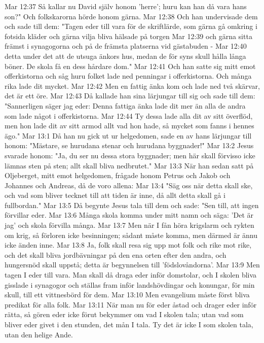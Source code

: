 Mar 12:37  Så kallar nu David själv honom 'herre'; huru kan han då vara hans son?" Och folkskarorna hörde honom gärna.
Mar 12:38  Och han undervisade dem och sade till dem: "Tagen eder till vara för de skriftlärde, som gärna gå omkring i fotsida kläder och gärna vilja bliva hälsade på torgen
Mar 12:39  och gärna sitta främst i synagogorna och på de främsta platserna vid gästabuden -
Mar 12:40  detta under det att de utsuga änkors hus, medan de för syns skull hålla långa böner. De skola få en dess hårdare dom."
Mar 12:41  Och han satte sig mitt emot offerkistorna och såg huru folket lade ned penningar i offerkistorna. Och många rika lade dit mycket.
Mar 12:42  Men en fattig änka kom och lade ned två skärvar, det är ett öre.
Mar 12:43  Då kallade han sina lärjungar till sig och sade till dem: "Sannerligen säger jag eder: Denna fattiga änka lade dit mer än alla de andra som lade något i offerkistorna.
Mar 12:44  Ty dessa lade alla dit av sitt överflöd, men hon lade dit av sitt armod allt vad hon hade, så mycket som fanns i hennes ägo."
Mar 13:1  Då han nu gick ut ur helgedomen, sade en av hans lärjungar till honom: "Mästare, se hurudana stenar och hurudana byggnader!"
Mar 13:2  Jesus svarade honom: "Ja, du ser nu dessa stora byggnader; men här skall förvisso icke lämnas sten på sten; allt skall bliva nedbrutet."
Mar 13:3  När han sedan satt på Oljeberget, mitt emot helgedomen, frågade honom Petrus och Jakob och Johannes och Andreas, då de voro allena:
Mar 13:4  "Säg oss när detta skall ske, och vad som bliver tecknet till att tiden är inne, då allt detta skall gå i fullbordan."
Mar 13:5  Då begynte Jesus tala till dem och sade: "Sen till, att ingen förvillar eder.
Mar 13:6  Många skola komma under mitt namn och säga: 'Det är jag' och skola förvilla många.
Mar 13:7  Men när I fån höra krigslarm och rykten om krig, så förloren icke besinningen; sådant måste komma, men därmed är ännu icke änden inne.
Mar 13:8  Ja, folk skall resa sig upp mot folk och rike mot rike, och det skall bliva jordbävningar på den ena orten efter den andra, och hungersnöd skall uppstå; detta är begynnelsen till 'födslovåndorna'.
Mar 13:9  Men tagen I eder till vara. Man skall då draga eder inför domstolar, och I skolen bliva gisslade i synagogor och ställas fram inför landshövdingar och konungar, för min skull, till ett vittnesbörd för dem.
Mar 13:10  Men evangelium måste först bliva predikat för alla folk.
Mar 13:11  När man nu för eder åstad och drager eder inför rätta, så gören eder icke förut bekymmer om vad I skolen tala; utan vad som bliver eder givet i den stunden, det mån I tala. Ty det är icke I som skolen tala, utan den helige Ande.
